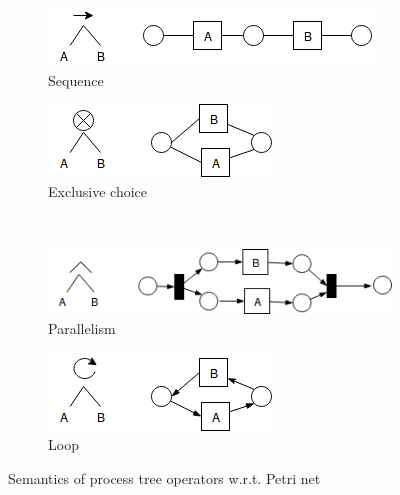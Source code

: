 \documentclass[]{article}
\begin{document}
\begin{figure}[!h]
	\centering
	\begin{subfigure}[b]{0.45\textwidth}
		\centering
		\includegraphics[width=\linewidth]{PT_PN_corresponding_01_seq_PN.png}
		\caption{Sequence}
		\label{fig:pt_pn_seq}
	\end{subfigure}%
    \quad
	\begin{subfigure}[b]{0.45\textwidth}
		\centering
		\includegraphics[width=\linewidth]{PT_PN_corresponding_02_xor_PN.png}
		\caption{Exclusive choice}
		\label{fig:pt_pn_xor}
	\end{subfigure}%
    \\ %
	\begin{subfigure}[b]{0.45\textwidth}
		\centering
		\includegraphics[width=\linewidth]{PT_PN_corresponding_03_and_PN.png}
		\caption{ Parallelism }
		\label{fig:pt_pn_and}
	\end{subfigure}%
    \quad
	\begin{subfigure}[b]{0.45\textwidth}
		\centering
		\includegraphics[width=\linewidth]{PT_PN_corresponding_04_loop_PN.png}
		\caption{Loop}
		\label{fig:pt_pn_loop}
	\end{subfigure}%
	\caption{Semantics of process tree operators w.r.t. Petri net}
	\label{fig:pn_pt_correspondings}
\end{figure}
\end{document}
